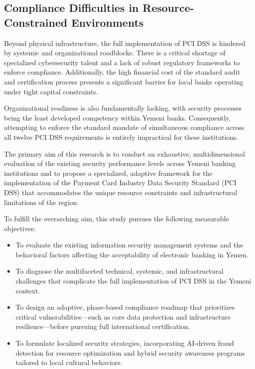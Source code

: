 \documentclass[12pt,a4paper,oneside]{report}
\begin{document}
	\subsection{Compliance Difficulties in Resource-Constrained Environments}
	Beyond physical infrastructure, the full implementation of PCI DSS is hindered by systemic and organizational roadblocks. There is a critical shortage of specialized cybersecurity talent and a lack of robust regulatory frameworks to enforce compliance. Additionally, the high financial cost of the standard audit and certification process presents a significant barrier for local banks operating under tight capital constraints. 
	
	Organizational readiness is also fundamentally lacking, with security processes being the least developed competency within Yemeni banks. Consequently, attempting to enforce the standard mandate of simultaneous compliance across all twelve PCI DSS requirements is entirely impractical for these institutions.
	
	The primary aim of this research is to conduct an exhaustive, multidimensional evaluation of the existing security performance levels across Yemeni banking institutions and to propose a specialized, adaptive framework for the implementation of the Payment Card Industry Data Security Standard (PCI DSS) that accommodates the unique resource constraints and infrastructural limitations of the region.
	
	To fulfill the overarching aim, this study pursues the following measurable objectives:
	\begin{itemize}
		\item To evaluate the existing information security management systems and the behavioral factors affecting the acceptability of electronic banking in Yemen.
		\item To diagnose the multifaceted technical, systemic, and infrastructural challenges that complicate the full implementation of PCI DSS in the Yemeni context.
		\item To design an adaptive, phase-based compliance roadmap that prioritizes critical vulnerabilities—such as core data protection and infrastructure resilience—before pursuing full international certification.
		\item To formulate localized security strategies, incorporating AI-driven fraud detection for resource optimization and hybrid security awareness programs tailored to local cultural behaviors.
	\end{itemize}
	
\end{document}
